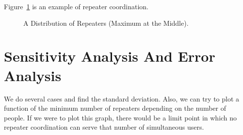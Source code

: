 \documentclass{icmmcm}
\begin{document}
Figure~\ref{fig:sample1} is an example of repeater coordination.
\begin{figure}[ht]
\begin{center}
\end{center}
\caption[A Distribution of Repeaters for a Uniform People Distribution]{A Distribution of Repeaters (Maximum at the Middle).\label{sample1}}%
\label{fig:sample1}
\end{figure}

\section{Sensitivity Analysis And Error Analysis}
We do several cases and find the standard deviation. Also, we can try to plot a function of the minimum number of repeaters depending on the number of people. If we were to plot this graph, there would be a limit point in which no repeater coordination can serve that number of simultaneous users.
\end{document}
